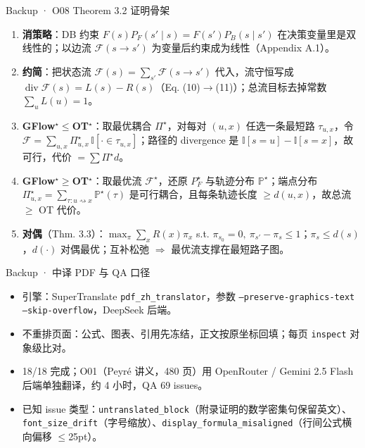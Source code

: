 \documentclass[aspectratio=169,10pt]{beamer}
\begin{document}
\begin{frame}{Backup · O08 Theorem 3.2 证明骨架}
\small
\begin{enumerate}
\item \textbf{消策略}：DB 约束 $F(s)P_F(s'\mid s)=F(s')P_B(s\mid s')$ 在决策变量里是双线性的；以边流 $\mathcal F(s\to s')$ 为变量后约束成为线性（Appendix A.1）。
\item \textbf{约简}：把状态流 $\mathcal F(s)=\sum_{s'}\mathcal F(s\to s')$ 代入，流守恒写成 $\operatorname{div}\mathcal F(s)=L(s)-R(s)$（Eq. (10)$\to$(11)）；总流目标去掉常数 $\sum_u L(u)=1$。
\item \textbf{GFlow$^\star\le$OT$^\star$}：取最优耦合 $\Pi^\star$，对每对 $(u,x)$ 任选一条最短路 $\tau_{u,x}$，令 $\mathcal F=\sum_{u,x}\Pi^\star_{u,x}\,\mathbb I[\cdot\in\tau_{u,x}]$；路径的 divergence 是 $\mathbb I[s=u]-\mathbb I[s=x]$，故可行，代价 $=\sum\Pi^\star d$。
\item \textbf{GFlow$^\star\ge$OT$^\star$}：取最优流 $\mathcal F^\star$，还原 $P_F^\star$ 与轨迹分布 $\mathbb P^\star$；端点分布 $\Pi^\star_{u,x}=\sum_{\tau:u\rightsquigarrow x}\mathbb P^\star(\tau)$ 是可行耦合，且每条轨迹长度 $\ge d(u,x)$，故总流 $\ge$ OT 代价。
\item \textbf{对偶}（Thm. 3.3）：$\max_\pi\sum_x R(x)\pi_x$ s.t. $\pi_{s_0}=0,\ \pi_{s'}-\pi_s\le1$；$\pi_s\le d(s)$，$d(\cdot)$ 对偶最优；互补松弛 $\Rightarrow$ 最优流支撑在最短路子图。
\end{enumerate}
\end{frame}
\begin{frame}{Backup · 中译 PDF 与 QA 口径}
\small
\begin{itemize}
\item 引擎：SuperTranslate \texttt{pdf\_zh\_translator}，参数 \texttt{--preserve-graphics-text --skip-overflow}，DeepSeek 后端。
\item 不重排页面：公式、图表、引用先冻结，正文按原坐标回填；每页 \texttt{inspect} 对象级比对。
\item 18/18 完成；O01（Peyr\'e 讲义，480 页）用 OpenRouter / Gemini 2.5 Flash 后端单独翻译，约 4 小时，QA 69 issues。
\item 已知 issue 类型：\texttt{untranslated\_block}（附录证明的数学密集句保留英文）、\texttt{font\_size\_drift}（字号缩放）、\texttt{display\_formula\_misaligned}（行间公式横向偏移 $\le$25pt）。
\end{itemize}
\end{frame}
\end{document}

